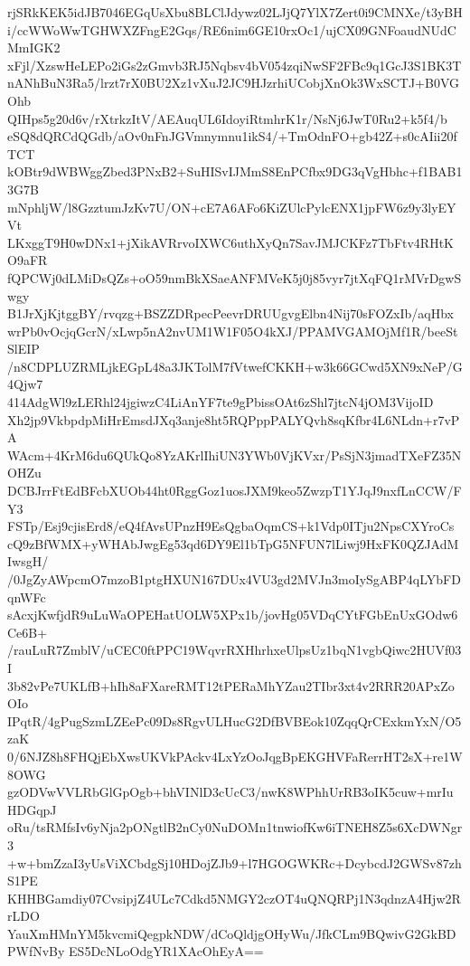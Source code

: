 rjSRkKEK5idJB7046EGqUsXbu8BLClJdywz02LJjQ7YlX7Zert0i9CMNXe/t3yBH
i/ccWWoWwTGHWXZFngE2Gqs/RE6nim6GE10rxOc1/ujCX09GNFoaudNUdCMmIGK2
xFjl/XzswHeLEPo2iGs2zGmvb3RJ5Nqbsv4bV054zqiNwSF2FBc9q1GcJ3S1BK3T
nANhBuN3Ra5/lrzt7rX0BU2Xz1vXuJ2JC9HJzrhiUCobjXnOk3WxSCTJ+B0VGOhb
QIHps5g20d6v/rXtrkzItV/AEAuqUL6IdoyiRtmhrK1r/NsNj6JwT0Ru2+k5f4/b
eSQ8dQRCdQGdb/aOv0nFnJGVmnymnu1ikS4/+TmOdnFO+gb42Z+s0cAIii20fTCT
kOBtr9dWBWggZbed3PNxB2+SuHISvIJMmS8EnPCfbx9DG3qVgHbhc+f1BAB13G7B
mNphljW/l8GzztumJzKv7U/ON+cE7A6AFo6KiZUlcPylcENX1jpFW6z9y3lyEYVt
LKxggT9H0wDNx1+jXikAVRrvoIXWC6uthXyQn7SavJMJCKFz7TbFtv4RHtKO9aFR
fQPCWj0dLMiDsQZs+oO59nmBkXSaeANFMVeK5j0j85vyr7jtXqFQ1rMVrDgwSwgy
B1JrXjKjtggBY/rvqzg+BSZZDRpecPeevrDRUUgvgElbn4Nij70sFOZxIb/aqHbx
wrPb0vOcjqGcrN/xLwp5nA2nvUM1W1F05O4kXJ/PPAMVGAMOjMf1R/beeStSlEIP
/n8CDPLUZRMLjkEGpL48a3JKTolM7fVtwefCKKH+w3k66GCwd5XN9xNeP/G4Qjw7
414AdgWl9zLERhl24jgiwzC4LiAnYF7te9gPbissOAt6zShl7jtcN4jOM3VijoID
Xh2jp9VkbpdpMiHrEmsdJXq3anje8ht5RQPppPALYQvh8sqKfbr4L6NLdn+r7vPA
WAcm+4KrM6du6QUkQo8YzAKrlIhiUN3YWb0VjKVxr/PsSjN3jmadTXeFZ35NOHZu
DCBJrrFtEdBFcbXUOb44ht0RggGoz1uosJXM9keo5ZwzpT1YJqJ9nxfLnCCW/FY3
FSTp/Esj9cjisErd8/eQ4fAvsUPnzH9EsQgbaOqmCS+k1Vdp0ITju2NpsCXYroCs
cQ9zBfWMX+yWHAbJwgEg53qd6DY9El1bTpG5NFUN7lLiwj9HxFK0QZJAdMIwsgH/
/0JgZyAWpcmO7mzoB1ptgHXUN167DUx4VU3gd2MVJn3moIySgABP4qLYbFDqnWFc
sAcxjKwfjdR9uLuWaOPEHatUOLW5XPx1b/jovHg05VDqCYtFGbEnUxGOdw6Ce6B+
/rauLuR7ZmblV/uCEC0ftPPC19WqvrRXHhrhxeUlpsUz1bqN1vgbQiwc2HUVf03I
3b82vPe7UKLfB+hIh8aFXareRMT12tPERaMhYZau2TIbr3xt4v2RRR20APxZoOIo
IPqtR/4gPugSzmLZEePc09Ds8RgvULHucG2DfBVBEok10ZqqQrCExkmYxN/O5zaK
0/6NJZ8h8FHQjEbXwsUKVkPAckv4LxYzOoJqgBpEKGHVFaRerrHT2sX+re1W8OWG
gzODVwVVLRbGlGpOgb+bhVINlD3cUcC3/nwK8WPhhUrRB3oIK5cuw+mrIuHDGqpJ
oRu/tsRMfsIv6yNja2pONgtlB2nCy0NuDOMn1tnwiofKw6iTNEH8Z5s6XcDWNgr3
+w+bmZzaI3yUsViXCbdgSj10HDojZJb9+l7HGOGWKRc+DcybcdJ2GWSv87zhS1PE
KHHBGamdiy07CvsipjZ4ULc7Cdkd5NMGY2czOT4uQNQRPj1N3qdnzA4Hjw2RrLDO
YauXmHMnYM5kvcmiQegpkNDW/dCoQldjgOHyWu/JfkCLm9BQwivG2GkBDPWfNvBy
ES5DcNLoOdgYR1XAcOhEyA==
